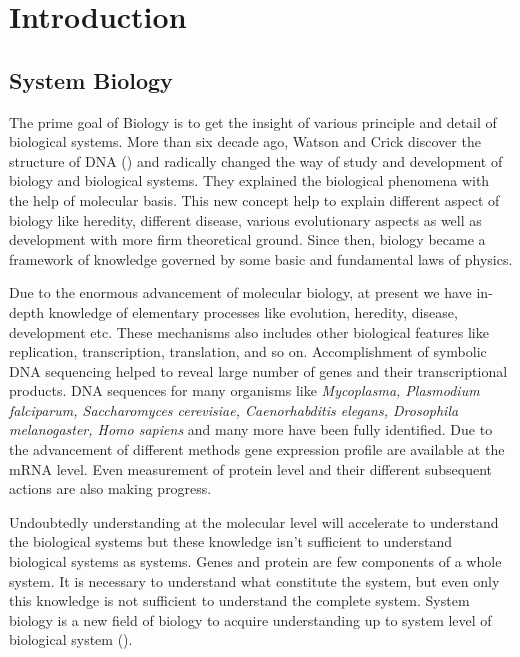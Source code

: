 
\chapter{Introduction} %

\label{Chapter1} %



\section{System Biology}
The prime goal of Biology is to get the insight of various principle and detail of biological systems. More than 
six decade ago, Watson and Crick discover the structure of DNA (\cite{Watson:1953}) and radically changed the way of 
study and development of biology and biological systems. They explained the biological phenomena with the help of
molecular basis. This new concept help to explain different aspect of biology like heredity, different disease,
various evolutionary aspects as well as development with more firm theoretical ground. Since then, biology became
a framework of knowledge governed by some basic and fundamental laws of physics.

Due to the enormous advancement of molecular biology, at present we have in-depth knowledge of elementary processes 
like evolution, heredity, disease, development etc. These mechanisms also includes other biological features like 
replication, transcription, translation, and so on. Accomplishment of symbolic DNA sequencing helped to reveal
large number of genes and their transcriptional products. DNA sequences for many organisms like \textit{Mycoplasma,
Plasmodium falciparum, Saccharomyces cerevisiae, \textit{Caenorhabditis elegans}, Drosophila melanogaster, Homo sapiens}
and many more have been fully identified. Due to the advancement of different methods gene expression profile are 
available at the mRNA level. Even measurement of protein level and their different subsequent actions are also making
progress. 

Undoubtedly understanding at the molecular level will accelerate to understand the biological systems but these
knowledge isn't sufficient to understand biological systems as systems. Genes and protein are few components of a 
whole system. It is necessary to understand what constitute the system, but even only this knowledge is not sufficient to
understand the complete system. System biology is a new field of biology to acquire understanding up to system level
of biological system (\cite{Kitano:2000}). 

